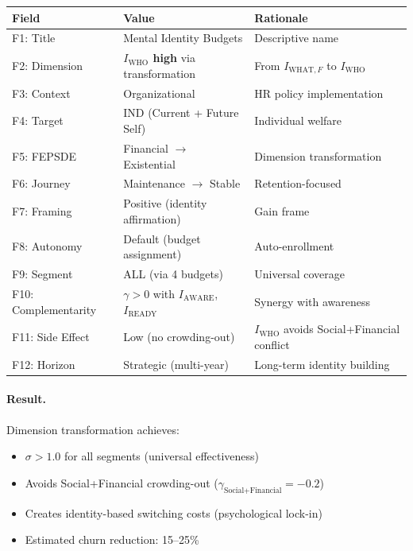 \begin{table}[htbp]
\centering
\small
\begin{tabular}{@{}lll@{}}
\toprule
\textbf{Field} & \textbf{Value} & \textbf{Rationale} \\
\midrule
F1: Title & Mental Identity Budgets & Descriptive name \\
F2: Dimension & \textbf{$I_{\text{WHO}}$ high} via transformation & From $I_{\text{WHAT},F}$ to $I_{\text{WHO}}$ \\
F3: Context & Organizational & HR policy implementation \\
F4: Target & IND (Current + Future Self) & Individual welfare \\
F5: FEPSDE & Financial $\rightarrow$ Existential & Dimension transformation \\
F6: Journey & Maintenance $\rightarrow$ Stable & Retention-focused \\
F7: Framing & Positive (identity affirmation) & Gain frame \\
F8: Autonomy & Default (budget assignment) & Auto-enrollment \\
F9: Segment & ALL (via 4 budgets) & Universal coverage \\
F10: Complementarity & $\gamma > 0$ with $I_{\text{AWARE}}$, $I_{\text{READY}}$ & Synergy with awareness \\
F11: Side Effect & Low (no crowding-out) & $I_{\text{WHO}}$ avoids Social+Financial conflict \\
F12: Horizon & Strategic (multi-year) & Long-term identity building \\
\bottomrule
\end{tabular}
\end{table}

\paragraph{Result.} Dimension transformation achieves:
\begin{itemize}[nosep]
    \item $\sigma > 1.0$ for all segments (universal effectiveness)
    \item Avoids Social+Financial crowding-out ($\gamma_{\text{Social+Financial}} = -0.2$)
    \item Creates identity-based switching costs (psychological lock-in)
    \item Estimated churn reduction: 15--25\%
\end{itemize}

